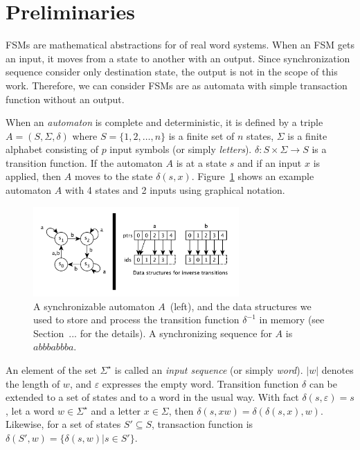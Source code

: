 \documentclass[12pt]{article}
\newcommand{\comment}[2]{{\color{red}{\bf (#1: #2)}}}
\begin{document}
\newpage
\section{Preliminaries}
\label{sec:Preliminaries}
FSMs are mathematical abstractions for of real word systems. When an FSM gets an input, it moves from a state to another with an output. Since synchronization sequence consider only destination state, the output is not in the scope of this work. Therefore, we can consider FSMs are as automata with simple transaction function without an output.

When an {\em automaton} is complete and deterministic, it is defined by a triple $A=(S, \Sigma, \delta)$  where $S = \{1, 2, \ldots, n\}$ is a finite set of $n$ states, $\Sigma$ is a finite alphabet consisting of $p$ input symbols (or simply {\em letters}). $\delta : S \times \Sigma \rightarrow S$ is a transition function. If the automaton $A$ is at a state $s$ and if an input $x$ is applied, then $A$ moves to the state $\delta(s,x)$. Figure~\ref{fig:inv} shows an example automaton $A$ with 4 states and 2 inputs using graphical notation.

\begin{figure}[h]
\centering
\includegraphics[width=0.7\textwidth]{figs/inverse.pdf}
\caption{A synchronizable automaton $A$~(left), and the data structures we used to store and process
the transition function $\delta^{-1}$  in memory (see Section~... for the details). A synchronizing sequence for $A$ is $abbbabbba$. \comment{sertac}{caption cok uzun belki iki figure olarak ayri ayri anlatabiliriz}}
\label{fig:inv}
\vspace*{-3ex}
\end{figure}

An element of the set $\Sigma^\star$ is called an {\em input sequence} (or simply {\em word}). $|w|$ denotes the length of $w$, and $\varepsilon$ expresses the empty word. Transition function $\delta$ can be extended to a set of states and to a word in the usual way. With fact $\delta(s,\varepsilon)=s$, let a word $w \in \Sigma^\star$ and a letter $x \in \Sigma$, then $\delta(s,xw) = \delta(\delta(s,x),w)$. Likewise, for a set of states $S' \subseteq S$, transaction function is $\delta(S',w) = \{ \delta(s,w) | s \in S'\}$.
\end{document}
